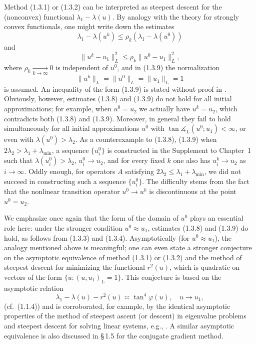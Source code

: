 \documentclass[11pt,oneside]{book}
\newcommand{\ang}{\measuredangle}
\begin{document}
Method (1.3.1) or (1.3.2) can be interpreted as steepest descent for the (nonconvex) functional $\lambda_1 - \lambda(u)$. By analogy with the theory for strongly convex functionals, one might write down the estimates
\[
\lambda_1 - \lambda(u^k) \leqslant \rho_k (\lambda_1 - \lambda(u^0)) \tag{1.3.8}
\]
and
\[
\|u^k - u_1\|_L^2 \leqslant \rho_k \|u^0 - u_1\|_L^2, \tag{1.3.9}
\]
where $\rho_k \xrightarrow[k \to \infty]{} 0$ is independent of $u^0$, and in (1.3.9) the normalization
\[
\|u^k\|_L = \|u^0\|_L = \|u_1\|_L = 1
\]
is assumed.
An inequality of the form (1.3.9) is stated without proof in \citep{CullumWilloughby1985}. Obviously, however, estimates (1.3.8) and (1.3.9) do not hold for all initial approximations; for example, when $u^0 = u_2$ we actually have $u^k = u_2$, which contradicts both (1.3.8) and (1.3.9). Moreover, in general they fail to hold simultaneously for all initial approximations $u^0$ with $\tan\ang_L(u^0; u_1) < \infty$, or even with $\lambda(u^0) > \lambda_2$. As a counterexample to (1.3.8), (1.3.9) when $2\lambda_2 > \lambda_1 + \lambda_{\min}$, a sequence $\{u_i^0\}$ is constructed in the Supplement to Chapter~1 such that $\lambda(u_i^0) > \lambda_2$, $u_i^0 \to u_2$, and for every fixed $k$ one also has $u_i^k \to u_2$ as $i \to \infty$. Oddly enough, for operators $A$ satisfying $2\lambda_2 \leqslant \lambda_1 + \lambda_{\min}$, we did not succeed in constructing such a sequence $\{u_i^0\}$. The difficulty stems from the fact that the nonlinear transition operator $u^0 \to u^k$ is discontinuous at the point $u^0 = u_2$.

We emphasize once again that the form of the domain of $u^0$ plays an essential role here: under the stronger condition $u^0 \approx u_1$, estimates (1.3.8) and (1.3.9) do hold, as follows from (1.3.3) and (1.3.4). Asymptotically (for $u^0 \approx u_1$), the analogy mentioned above is meaningful; one can even state a stronger conjecture on the asymptotic equivalence of method (1.3.1) or (1.3.2) and the method of steepest descent for minimizing the functional $r^2(u)$, which is quadratic on vectors of the form $\{u : (u, u_1)_L = 1\}$. This conjecture is based on the asymptotic relation
\[
\lambda_1 - \lambda(u) - r^2(u) \asymp \tan^4\varphi(u), \quad u \to u_1, \tag{1.3.10}
\]
(cf.\ (1.1.4)) and is corroborated, for example, by the identical asymptotic properties of the method of steepest ascent (or descent) in eigenvalue problems \citep{Zhuk1981} and steepest descent for solving linear systems, e.g., \citep{SamarskiiNikolaev1978}. A similar asymptotic equivalence is also discussed in \S\,1.5 for the conjugate gradient method.
\end{document}

